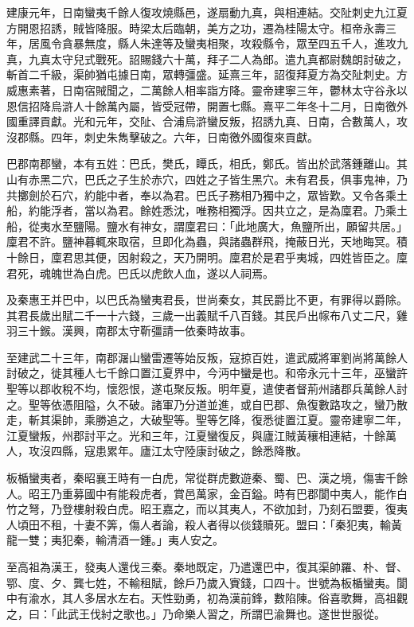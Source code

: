 \begin{pinyinscope}
建康元年，日南蠻夷千餘人復攻燒縣邑，遂扇動九真，與相連結。交阯刺史九江夏方開恩招誘，賊皆降服。時梁太后臨朝，美方之功，遷為桂陽太守。桓帝永壽三年，居風令貪暴無度，縣人朱達等及蠻夷相聚，攻殺縣令，眾至四五千人，進攻九真，九真太守兒式戰死。詔賜錢六十萬，拜子二人為郎。遣九真都尉魏朗討破之，斬首二千級，渠帥猶屯據日南，眾轉彊盛。延熹三年，詔復拜夏方為交阯刺史。方威惠素著，日南宿賊聞之，二萬餘人相率詣方降。靈帝建寧三年，鬱林太守谷永以恩信招降烏滸人十餘萬內屬，皆受冠帶，開置七縣。熹平二年冬十二月，日南徼外國重譯貢獻。光和元年，交阯、合浦烏滸蠻反叛，招誘九真、日南，合數萬人，攻沒郡縣。四年，刺史朱雋擊破之。六年，日南徼外國復來貢獻。

巴郡南郡蠻，本有五姓：巴氏，樊氏，瞫氏，相氏，鄭氏。皆出於武落鍾離山。其山有赤黑二穴，巴氏之子生於赤穴，四姓之子皆生黑穴。未有君長，俱事鬼神，乃共擲劍於石穴，約能中者，奉以為君。巴氏子務相乃獨中之，眾皆歎。又令各乘土船，約能浮者，當以為君。餘姓悉沈，唯務相獨浮。因共立之，是為廩君。乃乘土船，從夷水至鹽陽。鹽水有神女，謂廩君曰：「此地廣大，魚鹽所出，願留共居。」廩君不許。鹽神暮輒來取宿，旦即化為蟲，與諸蟲群飛，掩蔽日光，天地晦冥。積十餘日，廩君思其便，因射殺之，天乃開明。廩君於是君乎夷城，四姓皆臣之。廩君死，魂魄世為白虎。巴氏以虎飲人血，遂以人祠焉。

及秦惠王并巴中，以巴氏為蠻夷君長，世尚秦女，其民爵比不更，有罪得以爵除。其君長歲出賦二千一十六錢，三歲一出義賦千八百錢。其民戶出幏布八丈二尺，雞羽三十鍭。漢興，南郡太守靳彊請一依秦時故事。

至建武二十三年，南郡潳山蠻雷遷等始反叛，寇掠百姓，遣武威將軍劉尚將萬餘人討破之，徙其種人七千餘口置江夏界中，今沔中蠻是也。和帝永元十三年，巫蠻許聖等以郡收稅不均，懷怨恨，遂屯聚反叛。明年夏，遣使者督荊州諸郡兵萬餘人討之。聖等依憑阻隘，久不破。諸軍乃分道並進，或自巴郡、魚復數路攻之，蠻乃散走，斬其渠帥，乘勝追之，大破聖等。聖等乞降，復悉徙置江夏。靈帝建寧二年，江夏蠻叛，州郡討平之。光和三年，江夏蠻復反，與廬江賊黃穰相連結，十餘萬人，攻沒四縣，寇患累年。廬江太守陸康討破之，餘悉降散。

板楯蠻夷者，秦昭襄王時有一白虎，常從群虎數遊秦、蜀、巴、漢之境，傷害千餘人。昭王乃重募國中有能殺虎者，賞邑萬家，金百鎰。時有巴郡閬中夷人，能作白竹之弩，乃登樓射殺白虎。昭王嘉之，而以其夷人，不欲加封，乃刻石盟要，復夷人頃田不租，十妻不筭，傷人者論，殺人者得以倓錢贖死。盟曰：「秦犯夷，輸黃龍一雙；夷犯秦，輸清酒一鍾。」夷人安之。

至高祖為漢王，發夷人還伐三秦。秦地既定，乃遣還巴中，復其渠帥羅、朴、督、鄂、度、夕、龔七姓，不輸租賦，餘戶乃歲入賨錢，口四十。世號為板楯蠻夷。閬中有渝水，其人多居水左右。天性勁勇，初為漢前鋒，數陷陳。俗喜歌舞，高祖觀之，曰：「此武王伐紂之歌也。」乃命樂人習之，所謂巴渝舞也。遂世世服從。


\end{pinyinscope}
